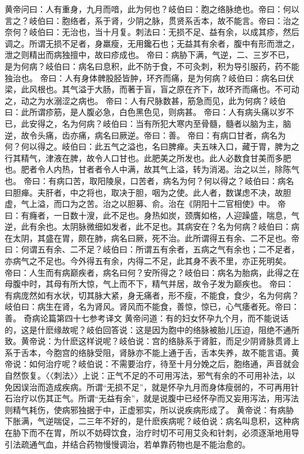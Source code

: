 \documentclass[a4paper,12pt,UTF8,twoside]{ctexbook}
\begin{document}
黄帝问曰：人有重身，九月而喑，此为何也？岐伯曰：胞之络脉绝也。帝曰：何以言之？岐伯曰：胞络者，系于肾，少阴之脉，贯贤系舌本，故不能言。帝曰：治之奈何？岐伯曰：无治也，当十月复。刺法曰：无损不足、益有余，以成其疹，然后调之。所谓无损不足者，身羸瘦，无用鑱石也；无益其有余者，腹中有形而泄之，泄之则精出而病独擅中，故曰疹成也。
帝曰：病胁下满，气逆，二、三岁不已，是为何病？岐伯曰：病名曰息积，此不防于食，不可灸刺，积为导引服药，药不能独治也。
帝曰：人有身体髀股胫皆肿，环齐而痛，是为何病？岐伯曰：病名曰伏梁，此风根也。其气溢于大肠，而著于盲，盲之原在齐下，故环齐而痛也。不可动之，动之为水溺涩之病也。
帝曰：人有尺脉数甚，筋急而见，此为何病？岐伯曰：此所谓疹筋，是人腹必急，白色黑色见，则病甚。
帝曰：人有病头痛以岁不已，此安得之，名为何病？岐伯曰：当有所犯大寒内至骨髓，髓者以脑为主，脑逆，故令头痛，齿亦痛，病名曰厥逆。帝曰：善。
帝曰：有病口甘者，病名为何？何以得之。岐伯曰：此五气之溢也，名曰脾瘅。夫五味入口，藏于胃，脾为之行其精气，津液在脾，故令人口甘也。此肥美之所发也。此人必数食甘美而多肥也。肥者令人内热，甘者者令人中满，故其气上溢，转为消渴。治之以兰，除陈气也。
帝曰：有病口苦，取阳陵泉，口苦者，病名为何？何以得之？岐伯曰：病名曰胆瘅。夫肝者，中之将也，取决于胆，咽为之使。此人者，数谋虑不决，故胆虚，气上溢，而口为之苦。治之以胆募、俞。治在《阴阳十二官相使》中。
帝曰：有癃者，一日数十溲，此不足也。身热如炭，颈膺如格，人迎躁盛，喘息，气逆，此有余也。太阴脉微细如发者，此不足也。其病安在？名为何病？岐伯曰：病在太阴，其盛在胃，颇在肺，病名曰厥，死不治。此所谓得五有余、二不足也。帝曰：何谓五有余、二不足？岐伯曰：所谓五有余者，五病之气有余也；二不足者，亦病气之不足也。今外得五有余，内得二不足，此其身不表不里，亦正死明矣。
帝曰：人生而有病巅疾者，病名曰何？安所得之？岐伯曰：病名为胎病，此得之在母腹中时，其母有所大惊，气上而不下，精气并居，故令子发为巅疾也。
帝曰：有病庞然如有水状，切其脉大紧，身无痛者，形不瘦，不能食，食少，名为何病？岐伯曰：病生在肾，名为肾风。肾风而不能食，善惊，惊已，心气痿者死。帝曰：善。
奇病论篇第四十七参考译文
黄帝问道：有的妇女怀孕九个月，而不能说话的，这是什麽缘故呢？岐伯回答说：这是因为胞中的络脉被胎儿压迫，阻绝不通所致。黄帝说：为什麽这样说呢？岐伯说：宫的络脉系于肾脏，而足少阴肾脉贯肾上系于舌本，今胞宫的络脉受阻，肾脉亦不能上通于舌，舌本失养，故不能言语。黄帝说：如何治疗呢？岐伯说：不需要治疗，待至十月分娩之后，胞络通，声音就会自然恢复。〈〈刺法〉〉上说：正气不足的不可用泻法，邪气有余的不可用补法，以免因误治而造成疾病。所谓“无损不足”，就是怀孕九月而身体瘦弱的，不可再用针石治疗以伤其正气。所谓“无益有余”，就是说腹中已经怀孕而又妄用泻法，用泻法则精气耗伤，使病邪独据于中，正虚邪实，所以说疾病形成了。
黄帝说：有病胁下胀满，气逆喘促，二三年不好的，是什麽疾病呢？岐伯说：病名叫息积，这种病在胁下而不在胃，所以不妨碍饮食，治疗时切不可用艾灸和针刺，必须逐渐地用导引法疏通气血，并结合药物慢慢调治，若单靠药物也是不能治愈的。
\end{document}
